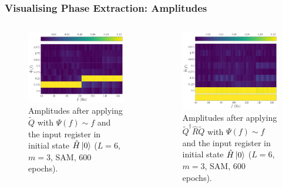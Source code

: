 \documentclass{beamer}
\begin{document}
\begin{frame}
\frametitle{Visualising Phase Extraction: Amplitudes}
\begin{columns}
\begin{column}{0.5\textwidth}
\begin{figure}
\centering 
\includegraphics[width=\textwidth]{im/Q_amp_linear_H}
\caption{Amplitudes after applying $\tilde{Q}$ with $\Psi(f) \sim f$ and the input register in initial state $\hat{H} \ket{0}$ ($L=6$, $m=3$, SAM, 600 epochs). }
\end{figure}
\end{column}
\begin{column}{0.5\textwidth}
\begin{figure}
\centering 
\includegraphics[width=\textwidth]{im/QRQ_amp_linear_H}
\caption{Amplitudes after applying $\tilde{Q}^\dagger \hat{R} \tilde{Q}$ with $\Psi(f) \sim f$ and the input register in initial state $\hat{H} \ket{0}$ ($L=6$, $m=3$, SAM, 600 epochs). }
\end{figure}
\end{column}
\end{columns}
\end{frame}
\end{document}

